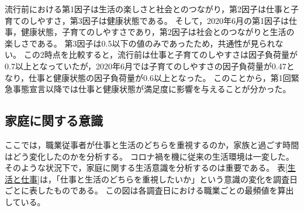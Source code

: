 \documentclass[paper={210mm,297mm},line_length=35zw,number_of_lines=31,head_space=30mm,gutter=40mm,baselineskip=2.0zw,headfoot_verticalposition=1.5zw]{jlreq}
\begin{document}
流行前における第1因子は生活の楽しさと社会とのつながり，第2因子は仕事と子育てのしやすさ，第3因子は健康状態である。
そして，2020年6月の第1因子は仕事，健康状態，子育てのしやすさであり，第2因子は社会とのつながりと生活の楽しさである。
第3因子は0.5以下の値のみであったため，共通性が見られない。
この2時点を比較すると，流行前は仕事と子育てのしやすさは因子負荷量が0.7以上となっていたが，2020年6月では子育てのしやすさの因子負荷量が0.47となり，仕事と健康状態の因子負荷量が0.6以上となった。
このことから，第1回緊急事態宣言以降では仕事と健康状態が満足度に影響を与えることが分かった。\\

\subsection{家庭に関する意識}

ここでは，職業従事者が仕事と生活のどちらを重視するのか，家族と過ごす時間はどう変化したのかを分析する。
コロナ禍を機に従来の生活環境は一変した。
そのような状況下で，家庭に関する生活意識を分析するのは重要である。
表\ref{生活と仕事}は，「仕事と生活のどちらを重視したいか」という意識の変化を調査日ごとに表したものである。
この図は各調査日における職業ごとの最頻値を算出している。\\
\end{document}
